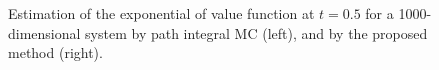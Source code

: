 \documentclass[letterpaper]{article} %
\begin{document}



\begin{figure}[t]
  \begin{subfigure}{0.49\columnwidth}
  
  \end{subfigure}
  \begin{subfigure}{0.49\columnwidth}
  
  \end{subfigure} 
  \vspace{-0.3em}
  \caption{Estimation of the exponential of value function at $t=0.5$ for a 1000-dimensional system by path integral MC (left), and by the proposed method (right).}
  \label{fig:value_func_visual_1000d}
\end{figure}
  
\end{document}
